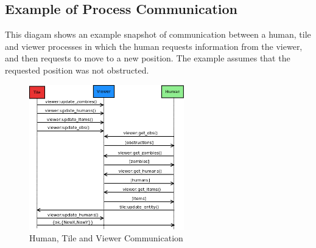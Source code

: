 \subsection{Example of Process Communication}
This diagam shows an example snapshot of communication between a human, tile and viewer processes in which the human requests information from the viewer, and then requests to move to a new position. The example assumes that the requested position was not obstructed.
\begin{figure}[h]
  \centering
  \includegraphics[width=0.6\textwidth]{img/tile-viewer-human-msgs.png}
  \caption{Human, Tile and Viewer Communication}
  \label{fig:tile_viewer_communication}
\end{figure}

\clearpage
\endinput
